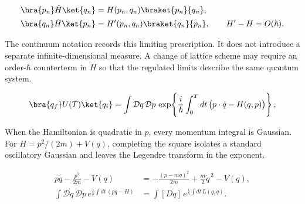 \begin{align}
  \bra{p_n}\hat H\ket{q_n}
  &=H(p_n,q_n)\braket{p_n}{q_n},
  \label{eq:proposal-left-ordering}\\
  \bra{q_n}\hat H\ket{p_n}
  &=H'(p_n,q_n)\braket{q_n}{p_n},
  \qquad H'-H=O(\hbar).
  \label{eq:proposal-right-ordering}
\end{align}


The continuum notation records this limiting prescription.  It does not
introduce a separate infinite-dimensional measure.  A change of lattice
scheme may require an order-$\hbar$ counterterm in $H$ so that the regulated
limits describe the same quantum system.

\begin{equation}
  \bra{q_f}U(T)\ket{q_i}
  =\int\mathcal Dq\,\mathcal Dp\,
  \exp\!\left\{
    \frac{i}{\hbar}\int_0^Tdt\,
    \bigl(p\cdot\dot q-H(q,p)\bigr)
  \right\},
  \label{eq:proposal-continuum-phase-space}
\end{equation}

When the Hamiltonian is quadratic in $p$, every momentum integral is Gaussian.
For $H=p^2/(2m)+V(q)$, completing the square isolates a standard oscillatory
Gaussian and leaves the Legendre transform in the exponent.

\begin{align}
  p\dot q-\frac{p^2}{2m}-V(q)
  &=-\frac{(p-m\dot q)^2}{2m}
    +\frac{m}{2}\dot q^{\,2}-V(q),
  \label{eq:proposal-complete-momentum-square}\\
  \int\mathcal Dq\,\mathcal Dp\,
  e^{\frac{i}{\hbar}\int dt\,(p\dot q-H)}
  &=\int[Dq]\,
  e^{\frac{i}{\hbar}\int dt\,L(q,\dot q)}.
  \label{eq:proposal-momentum-reduction}
\end{align}

